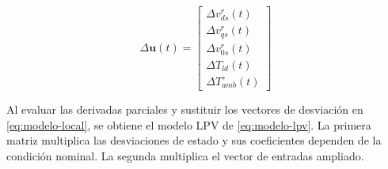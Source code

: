 \documentclass[blue,fullpaper]{ludusofficial}  %
\begin{document}
\begin{equation}
\label{eq:entradas-ampliadas}
\Delta \mathbf{u}(t)=\begin{bmatrix} \Delta v_{ds}^{r}(t) \\ \Delta v_{qs}^{r}(t) \\ \Delta v_{0s}^{r}(t) \\\Delta T_{ld}(t) \\ \Delta T_{amb}^{\circ}(t)\end{bmatrix}
\end{equation}

Al evaluar las derivadas parciales y sustituir los vectores de desviación en \eqref{eq:modelo-local}, se obtiene el modelo LPV de \eqref{eq:modelo-lpv}. La primera matriz multiplica las desviaciones de estado y sus coeficientes dependen de la condición nominal. La segunda multiplica el vector de entradas ampliado.
\end{document}
